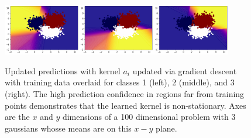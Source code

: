 \begin{figure}[!ht]
    \centering
        \includegraphics[width=0.3\textwidth]{c4_figures/svm1.png}\includegraphics[width=0.3\textwidth]{c4_figures/svm2.png}\includegraphics[width=0.3\textwidth]{c4_figures/svm3.png}
    \caption{Updated predictions with kernel $a_i$ updated via gradient descent with training data overlaid for classes 1 (left), 2 (middle), and 3 (right). The high prediction confidence in regions far from training points demonstrates that the learned kernel is non-stationary. Axes are the $x$ and $y$ dimensions of a 100 dimensional problem with 3 gaussians whosse means are on this $x-y$ plane.}
    \label{fig:svm}
\end{figure}
